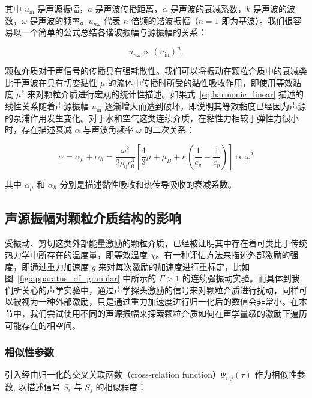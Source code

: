 其中 $u_{\text{in}}$ 是声源振幅，$a$ 是声波传播距离，$\alpha$ 是声波的衰减系数，$k$ 是声波的波数，$\omega$ 是声波的频率。$u_{n\omega}$ 代表 $n$ 倍频的谐波振幅（$n=1$ 即为基波）。我们很容易以一个简单的公式总结各谐波振幅与源振幅的关系：

\begin{equation}
  u_{n\omega} \propto \left(u_{\text{in}}\right)^{n}.\label{eq:harmonic_linear}
\end{equation}

颗粒介质对于声信号的传播具有强耗散性。我们可以将振动在颗粒介质中的衰减类比于声波在具有切变黏性 $\mu$ 的流体中传播时所受的黏性吸收作用，即使用等效黏度 $\mu^{*}$ 来对颗粒介质进行宏观的统计性描述。如果式~\eqref{eq:harmonic_linear} 描述的线性关系随着声源振幅 $u_{\text{in}}$ 逐渐增大而遭到破坏，即说明其等效黏度已经因为声源的泵浦作用发生变化。对于水和空气这类连续介质，在黏性力相较于弹性力很小时，存在描述衰减 $\alpha$ 与声波角频率 $\omega$ 的二次关系：

\begin{equation}
  \alpha = \alpha_{\mu} + \alpha_{h} = \frac{\omega^{2}}{2\rho_{0}c_{0}^{3}}\left[\frac{4}{3}\mu + \mu_{B} + \kappa\left(\frac{1}{c_{v}} - \frac{1}{c_{p}}\right)\right]\propto \omega^{2}
\end{equation}

其中 $\alpha_{\mu}$ 和 $\alpha_{h}$ 分别是描述黏性吸收和热传导吸收的衰减系数。

\subsection{声源振幅对颗粒介质结构的影响}

受振动、剪切这类外部能量激励的颗粒介质，已经被证明其中存在着可类比于传统热力学中所存在的温度量，即等效温度 $\chi$。有一种评估方法来描述外部激励的强度，即通过重力加速度 $g$ 来对每次激励的加速度进行重标定，比如图~\ref{fig:apparatus_of_granular} 中所示的 $\Gamma>1$ 的连续强振动实验。而具体到我们所关心的声学实验中，通过声学探头激励的信号来对颗粒介质进行扰动，同样可以被视为一种外部激励，只是通过重力加速度进行归一化后的数值会非常小。在本节中，我们尝试使用不同的声源振幅来探索颗粒介质如何在声学量级的激励下遍历可能存在的相空间。

\subsubsection{相似性参数}

引入经由归一化的交叉关联函数（cross-relation function）$\Psi_{i,j}(\tau)$ 作为相似性参数, 以描述信号 $S_{i}$ 与 $S_{j}$ 的相似程度\cite{PhysRevLett.90.174302}：


